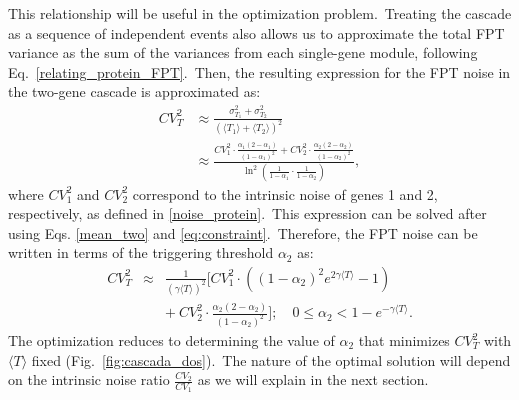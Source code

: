 \documentclass[aps,prb,reprint,superscriptaddress]{revtex4-2}
\begin{document}
This relationship will be useful in the optimization problem.~Treating the cascade as a sequence of independent events also allows us to approximate the total FPT variance as the sum of the variances from each single-gene module, following Eq.~\eqref{relating_protein_FPT}.~Then, the resulting expression for the FPT noise in the two-gene cascade is approximated as:
\begin{subequations}
\label{noise_two_gene}  
\begin{align}
CV^2_T&\approx\frac{\sigma_{T_1}^2+\sigma_{T_2}^2}{(\langle T_1\rangle+\langle T_2\rangle)^ 2}\\&\approx\frac{CV^2_{1}\cdot\frac{\alpha_{1}\left(2 - \alpha_{1}\right)}{\left(1-\alpha_{1}\right)^2} + CV^2_{2}\cdot\frac{\alpha_{2}\left(2 - \alpha_{2}\right)}{\left(1-\alpha_{2}\right)^2}}{\ln^2{\left(\frac{1}{1-\alpha_{1}}\cdot\frac{1}{1-\alpha_{2}}\right)}}, 
\end{align}
\end{subequations}
where \( CV_{1}^2 \) and \( CV_{2}^2 \) correspond to the intrinsic noise of genes 1 and 2, respectively, as defined in \eqref{noise_protein}.~This expression can be solved after using Eqs. \eqref{mean_two} and \eqref{eq:constraint}.~Therefore, the FPT noise can be written in terms of the triggering threshold $\alpha_2$ as:
\begin{eqnarray}\label{noise_two}
CV_T^2 &\approx& \frac{1}{\left( \gamma \langle T \rangle \right)^2} \bigg[  CV_1^2 \cdot \left( (1 - \alpha_2)^2 e^{2\gamma \langle T \rangle} - 1 \right)\\
&&+ \:
CV_2^2 \cdot \frac{\alpha_2(2 - \alpha_2)}{(1 - \alpha_2)^2} 
\bigg];\quad 0\leq\alpha_2<1-e^{-{\gamma}\langle T\rangle}.\nonumber
\end{eqnarray}
The optimization reduces to determining the value of $\alpha_2$ that minimizes $CV_T^2$ with $\langle T \rangle$ fixed (Fig.~\ref{fig:cascada_dos}).~The nature of the optimal solution will depend on the intrinsic noise ratio $\frac{CV_2}{CV_1}$ as we will explain in the next section.
\end{document}
